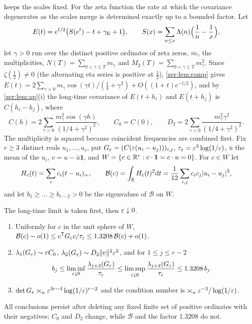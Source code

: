  keeps the scales fixed. For the zeta function the rate at which the
covariance degenerates as the scales merge is determined exactly up to a bounded factor. Let
\[
 E(t)=e^{t/2}\bigl(S(e^t)-t+\gamma_{\mathrm{E}}+1\bigr),\qquad S(x)=\sum_{n\le x}\Lambda(n)\Bigl(\frac1n-\frac1x\Bigr),
\]
let $\gamma>0$ run over the distinct positive ordinates of zeta zeros, $m_\gamma$ the
multiplicities, $N(T)=\sum_{0<\gamma\le T}m_\gamma$ and $M_2(T)=\sum_{0<\gamma\le T}m_\gamma^2$. Since
$\zeta(\tfrac12)\ne0$ (the alternating eta series is positive at $\tfrac12$), \cref{zer:lem:ramp}
gives $E(t)=2\sum_{\gamma>0}m_\gamma\cos(\gamma t)/(\tfrac14+\gamma^2)+O((1+t)e^{-t/2})$, and by
\cref{zer:lem:ap}(i) the long-time covariance of $E(t+h_i)$ and $E(t+h_j)$ is $C(h_i-h_j)$, where
\[
 C(h)=2\sum_{\gamma>0}\frac{m_\gamma^2\cos(\gamma h)}{(1/4+\gamma^2)^2},\qquad C_0=C(0),\qquad
 D_2=2\sum_{\gamma>0}\frac{m_\gamma^2\gamma^2}{(1/4+\gamma^2)^2}.
\]
The multiplicity is squared because coincident frequencies are combined first. Fix $r\ge3$
distinct reals $u_1,\dots,u_r$, put $G_\varepsilon=(C(\varepsilon(u_i-u_j)))_{i,j}$, $\tau_\varepsilon=\varepsilon^3\log(1/\varepsilon)$,
$\bar u$ the mean of the $u_i$, $v=u-\bar u\mathbf 1$, and
$W=\{c\in\mathbb{R}^r:c\cdot\mathbf 1=c\cdot u=0\}$. For $c\in W$ let
\[
 H_c(t)=\sum_ic_i(t-u_i)_+,\qquad \mathcal B(c)=\int_{\mathbb{R}} H_c(t)^2\mathrm{d} t=\frac1{12}\sum_{i,j}c_ic_j\lvert u_i-u_j\rvert^3,
\]
and let $b_1\ge\dots\ge b_{r-2}>0$ be the eigenvalues of $\mathcal B$ on $W$.

\begin{theorem}\label{zer:thm:coalesce}
The long-time limit is taken first, then $\varepsilon\downarrow0$.
\begin{enumerate}[label=\textup{(\roman*)}]
\item Uniformly for $c$ in the unit sphere of $W$,
$\mathcal B(c)-o(1)\le c^{\mathsf T}G_\varepsilon c/\tau_\varepsilon\le1.3208\,\mathcal B(c)+o(1)$.
\item $\lambda_1(G_\varepsilon)\sim rC_0$, $\lambda_2(G_\varepsilon)\sim D_2\lVert v\rVert^2\varepsilon^2$, and for $1\le j\le r-2$
\[
 b_j\le\liminf_{\varepsilon\downarrow0}\frac{\lambda_{j+2}(G_\varepsilon)}{\tau_\varepsilon}\le\limsup_{\varepsilon\downarrow0}\frac{\lambda_{j+2}(G_\varepsilon)}{\tau_\varepsilon}\le1.3208\,b_j .
\]
\item $\det G_\varepsilon\asymp_u\varepsilon^{3r-4}\log(1/\varepsilon)^{r-2}$ and the condition number is
$\asymp_u\varepsilon^{-3}/\log(1/\varepsilon)$.
\end{enumerate}
All conclusions persist after deleting any fixed finite set of positive ordinates with their
negatives; $C_0$ and $D_2$ change, while $\mathcal B$ and the factor $1.3208$ do not.
\end{theorem}


